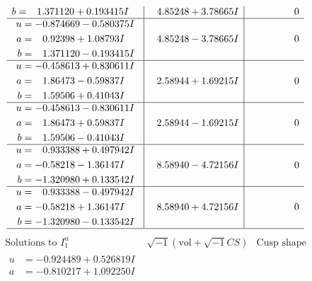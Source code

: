 \documentclass[1p]{elsarticle_modified}
\theoremstyle{definition}
\newcommand{\I}{\sqrt{-1}}
\begin{document}
$$\begin{array}{c|c|c}
\begin{aligned}
b &= \phantom{-}1.371120 + 0.193415 I\end{aligned}
 & \phantom{-}4.85248 + 3.78665 I & \phantom{-0.000000 } 0 \\ \hline\begin{aligned}
u &= -0.874669 - 0.580375 I \\
a &= \phantom{-}0.92398 + 1.08793 I \\
b &= \phantom{-}1.371120 - 0.193415 I\end{aligned}
 & \phantom{-}4.85248 - 3.78665 I & \phantom{-0.000000 } 0 \\ \hline\begin{aligned}
u &= -0.458613 + 0.830611 I \\
a &= \phantom{-}1.86473 - 0.59837 I \\
b &= \phantom{-}1.59506 + 0.41043 I\end{aligned}
 & \phantom{-}2.58944 + 1.69215 I & \phantom{-0.000000 } 0 \\ \hline\begin{aligned}
u &= -0.458613 - 0.830611 I \\
a &= \phantom{-}1.86473 + 0.59837 I \\
b &= \phantom{-}1.59506 - 0.41043 I\end{aligned}
 & \phantom{-}2.58944 - 1.69215 I & \phantom{-0.000000 } 0 \\ \hline\begin{aligned}
u &= \phantom{-}0.933388 + 0.497942 I \\
a &= -0.58218 - 1.36147 I \\
b &= -1.320980 + 0.133542 I\end{aligned}
 & \phantom{-}8.58940 - 4.72156 I & \phantom{-0.000000 } 0 \\ \hline\begin{aligned}
u &= \phantom{-}0.933388 - 0.497942 I \\
a &= -0.58218 + 1.36147 I \\
b &= -1.320980 - 0.133542 I\end{aligned}
 & \phantom{-}8.58940 + 4.72156 I & \phantom{-0.000000 } 0\\
 \hline 
 \end{array}$$\newpage$$\begin{array}{c|c|c}  
\text{Solutions to }I^u_{1}& \I (\text{vol} + \sqrt{-1}CS) & \text{Cusp shape}\\
 \hline 
\begin{aligned}
u &= -0.924489 + 0.526819 I \\
a &= -0.810217 + 1.092250 I \\

\end{aligned}
\end{array}$$
\end{document}
